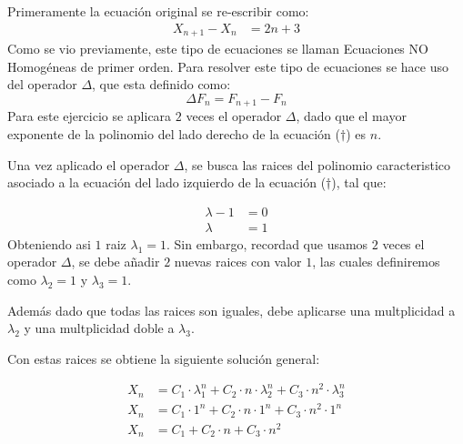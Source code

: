 \begin{solution}
Primeramente la ecuación original se re-escribir como:
\begin{align*}
    X_{n+1} - X_n&=  2n +3 \tag{$\dagger$}
\end{align*}
Como se vio previamente, este tipo de ecuaciones  se llaman Ecuaciones NO Homogéneas de primer orden. Para resolver este tipo de ecuaciones se hace uso del operador $\Delta$, que esta definido como:
$$\Delta F_n = F_{n+1} - F_n$$
Para este ejercicio se aplicara $2$ veces el operador $\Delta$, dado que el mayor exponente de la polinomio del lado derecho de la ecuación ($\dagger$) es $n$.

Una vez aplicado el operador $\Delta$, se busca las raices del polinomio caracteristico asociado a la ecuación  del lado izquierdo de la ecuación ($\dagger$), tal que:

\begin{align*}
    \lambda -1  &= 0\\
    \lambda &= 1
\end{align*}
Obteniendo asi $1$ raiz $\lambda_1 = 1$. Sin embargo, recordad que usamos $2$ veces el operador $\Delta$, se debe añadir $2$ nuevas raices con valor $1$, las cuales definiremos como $\lambda_2 =1$ y $\lambda_3 = 1$.

Además dado que todas las raices son iguales, debe aplicarse una multplicidad a $\lambda_2$ y una multplicidad doble a $\lambda_3$.

Con estas raices se obtiene la siguiente solución general:

\begin{align*}
    X_n &= C_1 \cdot \lambda_1^n + C_2 \cdot n \cdot \lambda_2^n + C_3 \cdot n^2 \cdot \lambda_3^n\\
    X_n &= C_1 \cdot 1^n + C_2 \cdot n \cdot 1^n + C_3 \cdot n^2 \cdot 1^n\\
    X_n &= C_1 + C_2 \cdot n + C_3 \cdot n^2 \tag{$\star$}
\end{align*}


\end{solution}
